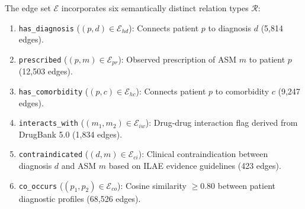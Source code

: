 \documentclass[11pt,a4paper]{article}
\begin{document}
The edge set $\mathcal{E}$ incorporates six semantically distinct relation types $\mathcal{R}$:
\begin{enumerate}
    \item \texttt{has\_diagnosis} ($(p, d) \in \mathcal{E}_{hd}$): Connects patient $p$ to diagnosis $d$ (5,814 edges).
    \item \texttt{prescribed} ($(p, m) \in \mathcal{E}_{pr}$): Observed prescription of ASM $m$ to patient $p$ (12,503 edges).
    \item \texttt{has\_comorbidity} ($(p, c) \in \mathcal{E}_{hc}$): Connects patient $p$ to comorbidity $c$ (9,247 edges).
    \item \texttt{interacts\_with} ($(m_1, m_2) \in \mathcal{E}_{iw}$): Drug-drug interaction flag derived from DrugBank 5.0 \cite{wishart2018drugbank} (1,834 edges).
    \item \texttt{contraindicated} ($(d, m) \in \mathcal{E}_{ci}$): Clinical contraindication between diagnosis $d$ and ASM $m$ based on ILAE evidence guidelines \cite{glauser2013ilae} (423 edges).
    \item \texttt{co\_occurs} ($(p_1, p_2) \in \mathcal{E}_{co}$): Cosine similarity $\ge 0.80$ between patient diagnostic profiles (68,526 edges).
\end{enumerate}
\end{document}
